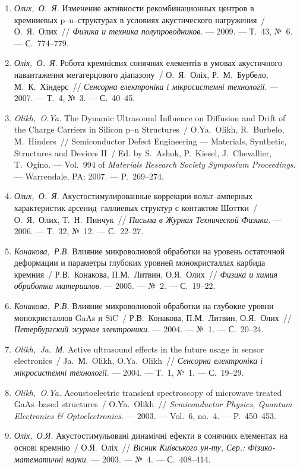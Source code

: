 \begin{enumerate}[label=\arabic*.,leftmargin=1cm,itemindent=0cm]
\item
\emph{Олих,~О.~Я.} Изменение активности
  рекомбинационных центров в кремниевых
  p--n--структурах в условиях акустического
  нагружения~/ О.~Я.~Олих~// \emph{Физика и
  техника полупроводников}. ---
  2009. ---
  Т.~43, {№}~6. ---
  {С.}~774--779.

\item
\emph{Оліх,~О.~Я.} Робота кремнієвих сонячних
  елементів в умовах акустичного
  навантаження мегагерцового діапазону~/
  О.~Я.~Оліх, Р.~М.~Бурбело, М.~К.~Хіндерс~//
  \emph{Сенсорна електроніка і
  мікросистемні технології}. ---
  2007. ---
  Т.~4, {№}~3. ---
  {С.}~40--45.

\item
\emph{Olikh,~O.Ya.} The Dynamic Ultrasound Influence on Diffusion and Drift
  of the Charge Carriers in Silicon p--n Structures~/ O.Ya.~Olikh, R.~Burbelo,
  M.~Hinders~// Semiconductor Defect Engineering --- Materials, Synthetic,
  Structures and Devices II~/ Ed. by S.~Ashok, P.~Kiesel, J.~Chevallier,
  T.~Ogino. ---
  Vol.~994 of \emph{Materials Research Society Symposium
  Proceedings}. ---
  Warrendale, PA: 2007. ---
  P.~269--274.

\item
\emph{Олих,~О.~Я.} Акустостимулированные
  коррекции вольт--амперных характеристик
  арсенид--галлиевых структур с контактом
  {Ш}оттки~/ О.~Я.~Олих, Т.~Н.~Пинчук~//
  \emph{Письма в Журнал Технической Физики}.
  ---
  2006. ---
  Т.~32, {№}~12. ---
  {С.}~22--27.

\item
\emph{Конакова,~Р.В.} Влияние микроволновой
  обработки на уровень остаточной
  деформации и параметры глубоких уровней
  монокристаллах карбида кремния~/
  Р.В.~Конакова, П.М.~Литвин, О.Я.~Олих~//
  \emph{Физика и химия обработки материалов}.
  ---
  2005. ---
  {№}~2. ---
  {С.}~19--22.


\item
\emph{Конакова,~Р.В.} Влияние микроволновой
  обработки на глубокие уровни
  монокристаллов {G}a{A}s и {S}i{C}~/ Р.В.~Конакова,
  П.М.~Литвин, О.Я.~Олих~// \emph{Петербургский
  журнал электроники}. ---
  2004. ---
  {№}~1. ---
  {С.}~20--24.

\item
\emph{Olikh,~Ja.~М.} Active ultrasound effects in the future usage in
  sensor electronics~/ Ja.~М.~Olikh, O.Ya.~Olikh~// \emph{Сенсорна
  електроніка і мікросистемні технології}.
  ---
  2004. ---
  Т.~1, {№}~1. ---
  {С.}~19--29.

\item
\emph{Olikh,~O.Ya.} Acoustoelectric transient spectroscopy of microwave
  treated {G}a{A}s--based structures~/ O.Ya.~Olikh~// \emph{Semiconductor
  Physics, Quantum Electronics \& Optoelectronics}. ---
  2003. ---
  Vol.~6, no.~4. ---
  P.~450--453.

\item
\emph{Оліх,~О.Я.} Акустостимульовані
  динамічні ефекти в сонячних елементах на
  основі кремнію~/ О.Я.~Оліх~// \emph{Вісник
  Київського ун-ту, Сер.: Фізико-математичні
  науки}. ---
  2003. ---
  {№}~4. ---
  {С.}~408--414.
\end{enumerate}

